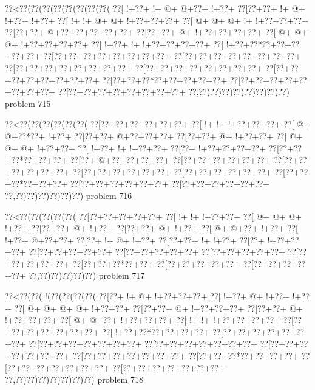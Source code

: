 \vbox{\vbox{\goo
\0??<\0??(\0??(\0??(\0??(\0??(\0??(\0??(\0??(
\0??[\- !+\0??+\- !+\- @+\- @+\0??+\- !+\0??+
\0??[\0??+\0??+\- !+\- @+\- !+\0??+\- !+\0??+
\0??[\- !+\- !+\- @+\- @+\- !+\0??+\0??+\0??+
\0??[\- @+\- @+\- @+\- !+\- !+\0??+\0??+\0??+
\0??[\0??+\0??+\- @+\0??+\0??+\0??+\0??+\0??+
\0??[\0??+\0??+\- @+\- !+\0??+\0??+\0??+\0??+
\0??[\- @+\- @+\- @+\- !+\0??+\0??+\0??+\0??+
\0??[\- !+\0??+\- !+\- !+\0??+\0??+\0??+\0??+
\0??[\- !+\0??+\0??*\0??+\0??+\0??+\0??+\0??+
\0??[\0??+\0??+\0??+\0??+\0??+\0??+\0??+\0??+
\0??[\0??+\0??+\0??+\0??+\0??+\0??+\0??+\0??+
\0??[\0??+\0??+\0??+\0??+\0??+\0??+\0??+\0??+
\0??[\0??+\0??+\0??+\0??+\0??+\0??+\0??+\0??+
\0??[\0??+\0??+\0??+\0??+\0??+\0??+\0??+\0??+
\0??[\0??+\0??+\0??*\0??+\0??+\0??+\0??+\0??+
\0??[\0??+\0??+\0??+\0??+\0??+\0??+\0??+\0??+
\0??[\0??+\0??+\0??+\0??+\0??+\0??+\0??+\0??+
\0??,\0??)\0??)\0??)\0??)\0??)\0??)\0??)\0??)
}
\hfil problem 715\hfil\break
}

\vbox{\vbox{\goo
\0??<\0??(\0??(\0??(\0??(\0??(\0??(
\0??[\0??+\0??+\0??+\0??+\0??+\0??+
\0??[\- !+\- !+\- !+\0??+\0??+\0??+
\0??[\- @+\- @+\0??*\0??+\- !+\0??+
\0??[\0??+\0??+\- @+\0??+\0??+\0??+
\0??[\0??+\0??+\- @+\- !+\0??+\0??+
\0??[\- @+\- @+\- @+\- !+\0??+\0??+
\0??[\- !+\0??+\- !+\- !+\0??+\0??+
\0??[\0??+\- !+\0??+\0??+\0??+\0??+
\0??[\0??+\0??+\0??*\0??+\0??+\0??+
\0??[\0??+\- @+\0??+\0??+\0??+\0??+
\0??[\0??+\0??+\0??+\0??+\0??+\0??+
\0??[\0??+\0??+\0??+\0??+\0??+\0??+
\0??[\0??+\0??+\0??+\0??+\0??+\0??+
\0??[\0??+\0??+\0??+\0??+\0??+\0??+
\0??[\0??+\0??+\0??*\0??+\0??+\0??+
\0??[\0??+\0??+\0??+\0??+\0??+\0??+
\0??[\0??+\0??+\0??+\0??+\0??+\0??+
\0??,\0??)\0??)\0??)\0??)\0??)\0??)
}
\hfil problem 716\hfil\break
}

\vbox{\vbox{\goo
\0??<\0??(\0??(\0??(\0??(\0??(
\0??[\0??+\0??+\0??+\0??+\0??+
\0??[\- !+\- !+\- !+\0??+\0??+
\0??[\- @+\- @+\- @+\- !+\0??+
\0??[\0??+\0??+\- @+\- !+\0??+
\0??[\0??+\0??+\- @+\- !+\0??+
\0??[\- @+\- @+\0??+\- !+\0??+
\0??[\- !+\0??+\- @+\0??+\0??+
\0??[\0??+\- !+\- @+\- !+\0??+
\0??[\0??+\0??+\- !+\- !+\0??+
\0??[\0??+\- !+\0??+\0??+\0??+
\0??[\0??+\0??+\0??+\0??+\0??+
\0??[\0??+\0??+\0??+\0??+\0??+
\0??[\0??+\0??+\0??+\0??+\0??+
\0??[\0??+\0??+\0??+\0??+\0??+
\0??[\0??+\0??+\0??*\0??+\0??+
\0??[\0??+\0??+\0??+\0??+\0??+
\0??[\0??+\0??+\0??+\0??+\0??+
\0??,\0??)\0??)\0??)\0??)\0??)
}
\hfil problem 717\hfil\break
}

\vbox{\vbox{\goo
\0??<\0??(\0??(\- !(\0??(\0??(\0??(\0??(
\0??[\0??+\- !+\- @+\- !+\0??+\0??+\0??+
\0??[\- !+\0??+\- @+\- !+\0??+\- !+\0??+
\0??[\- @+\- @+\- @+\- @+\- !+\0??+\0??+
\0??[\0??+\0??+\- @+\- !+\0??+\0??+\0??+
\0??[\0??+\0??+\- @+\- !+\0??+\0??+\0??+
\0??[\- @+\- @+\0??+\- !+\0??+\0??+\0??+
\0??[\- !+\- !+\- !+\0??+\0??+\0??+\0??+
\0??[\0??+\0??+\0??+\0??+\0??+\0??+\0??+
\0??[\- !+\0??+\0??*\0??+\0??+\0??+\0??+
\0??[\0??+\0??+\0??+\0??+\0??+\0??+\0??+
\0??[\0??+\0??+\0??+\0??+\0??+\0??+\0??+
\0??[\0??+\0??+\0??+\0??+\0??+\0??+\0??+
\0??[\0??+\0??+\0??+\0??+\0??+\0??+\0??+
\0??[\0??+\0??+\0??+\0??+\0??+\0??+\0??+
\0??[\0??+\0??+\0??*\0??+\0??+\0??+\0??+
\0??[\0??+\0??+\0??+\0??+\0??+\0??+\0??+
\0??[\0??+\0??+\0??+\0??+\0??+\0??+\0??+
\0??,\0??)\0??)\0??)\0??)\0??)\0??)\0??)
}
\hfil problem 718\hfil\break
}

